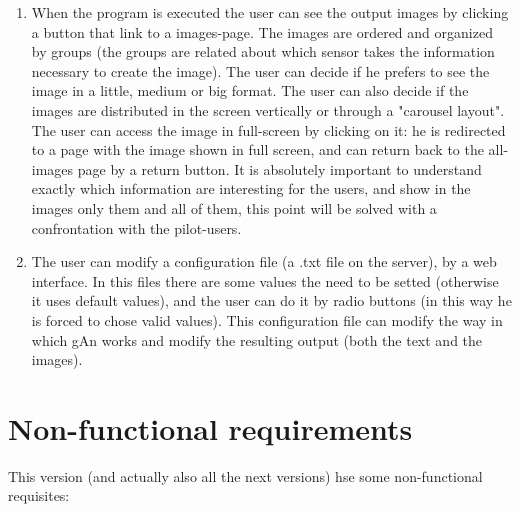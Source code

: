 \begin{enumerate}
\item When the program is executed the user can see the output images by clicking a button that link to a images-page. The images are ordered and organized by groups (the groups are related about which sensor takes the information necessary to create the image). The user can decide if he prefers to see the image in a little, medium or big format. The user can also decide if the images are distributed in the screen vertically or through a "carousel layout". The user can access the image in full-screen by clicking on it: he is redirected to a page with the image shown in full screen, and can return back to the all-images page by a return button. It is absolutely important to understand exactly which information are interesting for the users, and show in the images only them and all of them, this point will be solved with a confrontation with the pilot-users. 

\item The user can modify a configuration file (a .txt file on the server), by a web interface. In this files there are some values the need to be setted (otherwise it uses default values), and the user can do it by radio buttons (in this way he is forced to chose valid values). This configuration file can modify the way in which gAn works and modify the resulting output (both the text and the images).   

\end{enumerate}

 
\section{Non-functional requirements}

This version (and actually also all the next versions) hse some non-functional requisites:

